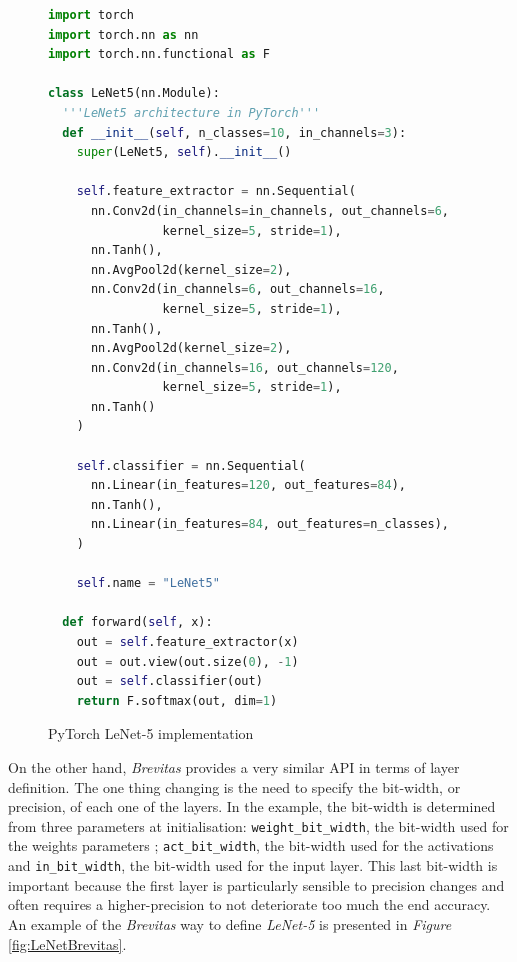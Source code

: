 \begin{figure}[htbp]
\centering
\begin{lstlisting}[language=Python]
import torch
import torch.nn as nn
import torch.nn.functional as F

class LeNet5(nn.Module):
  '''LeNet5 architecture in PyTorch'''
  def __init__(self, n_classes=10, in_channels=3):
    super(LeNet5, self).__init__()

    self.feature_extractor = nn.Sequential(
      nn.Conv2d(in_channels=in_channels, out_channels=6,
                kernel_size=5, stride=1),
      nn.Tanh(),
      nn.AvgPool2d(kernel_size=2),
      nn.Conv2d(in_channels=6, out_channels=16,
                kernel_size=5, stride=1),
      nn.Tanh(),
      nn.AvgPool2d(kernel_size=2),
      nn.Conv2d(in_channels=16, out_channels=120,
                kernel_size=5, stride=1),
      nn.Tanh()
    )

    self.classifier = nn.Sequential(
      nn.Linear(in_features=120, out_features=84),
      nn.Tanh(),
      nn.Linear(in_features=84, out_features=n_classes),
    )

    self.name = "LeNet5"

  def forward(self, x):
    out = self.feature_extractor(x)
    out = out.view(out.size(0), -1)
    out = self.classifier(out)
    return F.softmax(out, dim=1)
\end{lstlisting}
\caption[LeNetPyTorch]{PyTorch LeNet-5 \cite{LeCun1998} implementation}
	\label{fig:LeNetPyTorch}
\end{figure}


On the other hand, \emph{Brevitas} provides a very similar API in terms of layer definition. The one thing changing is the need to specify the bit-width, or precision, of each one of the layers. In the example, the bit-width is determined from three parameters at initialisation: \texttt{weight\_bit\_width}, the bit-width used for the weights parameters ; \texttt{act\_bit\_width}, the bit-width used for the activations and \texttt{in\_bit\_width}, the bit-width used for the input layer. This last bit-width is important because the first layer is particularly sensible to precision changes and often requires a higher-precision to not deteriorate too much the end accuracy. An example of the \emph{Brevitas} way to define \emph{LeNet-5} is presented in \emph{Figure} \ref{fig:LeNetBrevitas}.



